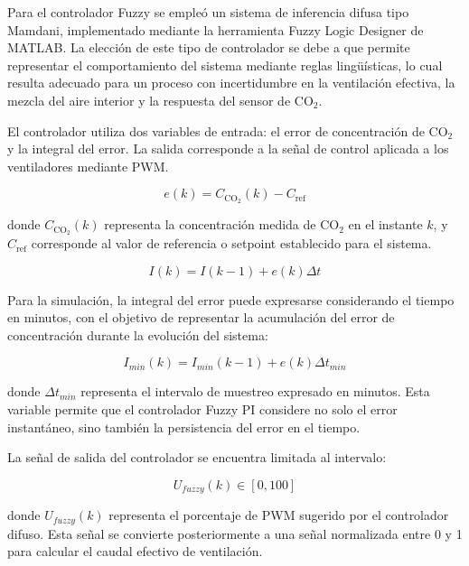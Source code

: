 Para el controlador Fuzzy se empleó un sistema de inferencia difusa tipo Mamdani, implementado mediante la herramienta Fuzzy Logic Designer de MATLAB. La elección de este tipo de controlador se debe a que permite representar el comportamiento del sistema mediante reglas lingüísticas, lo cual resulta adecuado para un proceso con incertidumbre en la ventilación efectiva, la mezcla del aire interior y la respuesta del sensor de CO$_2$.

El controlador utiliza dos variables de entrada: el error de concentración de CO$_2$ y la integral del error. La salida corresponde a la señal de control aplicada a los ventiladores mediante PWM.

\begin{equation}
    e(k)=C_{\mathrm{CO}_2}(k)-C_{\mathrm{ref}}
    \label{eq:error_fuzzy}
\end{equation}

donde \(C_{\mathrm{CO}_2}(k)\) representa la concentración medida de CO$_2$ en el instante \(k\), y \(C_{\mathrm{ref}}\) corresponde al valor de referencia o setpoint establecido para el sistema.

\begin{equation}
    I(k)=I(k-1)+e(k)\Delta t
    \label{eq:integral_error_fuzzy}
\end{equation}

Para la simulación, la integral del error puede expresarse considerando el tiempo en minutos, con el objetivo de representar la acumulación del error de concentración durante la evolución del sistema:

\begin{equation}
    I_{min}(k)=I_{min}(k-1)+e(k)\Delta t_{min}
\end{equation}

donde \(\Delta t_{min}\) representa el intervalo de muestreo expresado en minutos. Esta variable permite que el controlador Fuzzy PI considere no solo el error instantáneo, sino también la persistencia del error en el tiempo.

La señal de salida del controlador se encuentra limitada al intervalo:

\begin{equation}
    U_{fuzzy}(k)\in[0,100]
\end{equation}

donde \(U_{fuzzy}(k)\) representa el porcentaje de PWM sugerido por el controlador difuso. Esta señal se convierte posteriormente a una señal normalizada entre 0 y 1 para calcular el caudal efectivo de ventilación.

